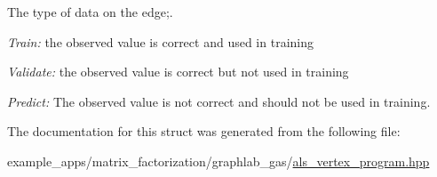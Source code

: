 The type of data on the edge;. 

\begin{DoxyItemize}
\item {\itshape Train\-:} the observed value is correct and used in training \item {\itshape Validate\-:} the observed value is correct but not used in training \item {\itshape Predict\-:} The observed value is not correct and should not be used in training. \end{DoxyItemize}


The documentation for this struct was generated from the following file\-:\begin{DoxyCompactItemize}
\item 
example\-\_\-apps/matrix\-\_\-factorization/graphlab\-\_\-gas/\hyperlink{als__vertex__program_8hpp}{als\-\_\-vertex\-\_\-program.\-hpp}\end{DoxyCompactItemize}
